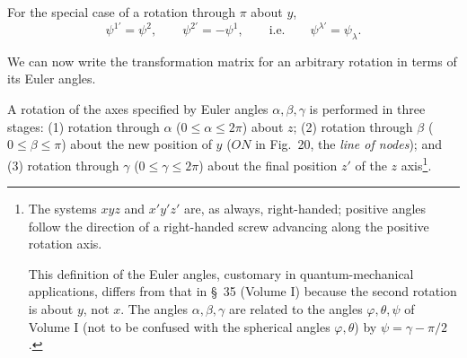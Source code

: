 For the special case of a rotation through $\pi$ about $y$,
\begin{equation}
 \psi^{1'}=\psi^2,\qquad \psi^{2'}=-\psi^1,
 \qquad\text{i.e.}\qquad \psi^{\lambda'}=\psi_\lambda.
 \tag{58.5}
\end{equation}

We can now write the transformation matrix for an arbitrary rotation in terms of its Euler angles.

A rotation of the axes specified by Euler angles $\alpha,\beta,\gamma$ is performed in three stages: (1) rotation through $\alpha$ ($0\leqslant\alpha\leqslant2\pi$) about $z$; (2) rotation through $\beta$ ($0\leqslant\beta\leqslant\pi$) about the new position of $y$ ($ON$ in Fig.~20, the \emph{line of nodes}); and (3) rotation through $\gamma$ ($0\leqslant\gamma\leqslant2\pi$) about the final position $z'$ of the $z$ axis\footnote{The systems $xyz$ and $x'y'z'$ are, as always, right-handed; positive angles follow the direction of a right-handed screw advancing along the positive rotation axis.

This definition of the Euler angles, customary in quantum-mechanical applications, differs from that in §~35 (Volume I) because the second rotation is about $y$, not $x$. The angles $\alpha,\beta,\gamma$ are related to the angles $\varphi,\theta,\psi$ of Volume I (not to be confused with the spherical angles $\varphi,\theta$) by $\psi=\gamma-\pi/2$.}.


